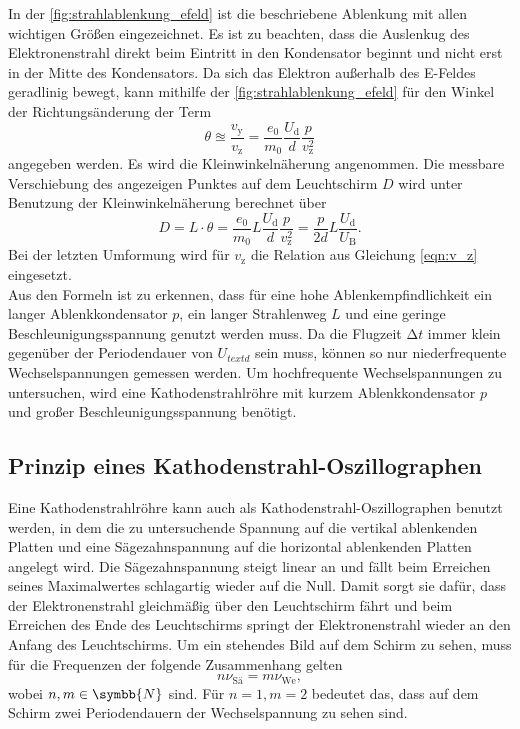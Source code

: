     \noindent In der \autoref{fig:strahlablenkung_efeld} ist die beschriebene Ablenkung mit allen wichtigen Größen eingezeichnet. Es ist zu beachten, dass die Auslenkug
    des Elektronenstrahl direkt beim Eintritt in den Kondensator beginnt und nicht erst in der Mitte des Kondensators. Da sich das Elektron außerhalb des E-Feldes 
    geradlinig bewegt, kann mithilfe der \autoref{fig:strahlablenkung_efeld} für den Winkel der Richtungsänderung der Term 
    \begin{equation*}
        \theta \approxeq \frac{v_{\text{y}}}{v_{\text{z}}} = \frac{e_0}{m_0} \frac{U_{\text{d}}}{d} \frac{p}{v_{\text{z}}^2}
    \end{equation*}
    angegeben werden. Es wird die Kleinwinkelnäherung angenommen. Die messbare Verschiebung des angezeigen Punktes auf dem Leuchtschirm $D$ wird unter Benutzung der Kleinwinkelnäherung
    berechnet über
    \begin{equation*}
        D = L \cdot \theta = \frac{e_0}{m_0} L \frac{U_{\text{d}}}{d} \frac{p}{v_{\text{z}}^2} = \frac{p}{2d} L \frac{U_{\text{d}}}{U_{\text{B}}}. 
    \end{equation*}
    Bei der letzten Umformung wird für $v_{\text{z}}$ die Relation aus Gleichung \eqref{eqn:v_z} eingesetzt. \\

    \noindent Aus den Formeln ist zu erkennen, dass für eine hohe Ablenkempfindlichkeit ein langer Ablenkkondensator $p$, ein langer Strahlenweg $L$ und eine geringe Beschleunigungsspannung 
    genutzt werden muss. Da die Flugzeit $\increment t$ immer klein gegenüber der Periodendauer von $U_{text{d}}$ sein muss, können so nur niederfrequente Wechselspannungen gemessen
    werden. Um hochfrequente Wechselspannungen zu untersuchen, wird eine Kathodenstrahlröhre mit  kurzem Ablenkkondensator $p$ und großer Beschleunigungsspannung benötigt.

\subsection{Prinzip eines Kathodenstrahl-Oszillographen}

    Eine Kathodenstrahlröhre kann auch als Kathodenstrahl-Oszillographen benutzt werden, in dem die zu untersuchende Spannung auf die vertikal ablenkenden Platten und eine Sägezahnspannung 
    auf die horizontal ablenkenden Platten angelegt wird. Die Sägezahnspannung steigt linear an und fällt beim Erreichen seines Maximalwertes schlagartig wieder auf die Null. 
    Damit sorgt sie dafür, dass der Elektronenstrahl gleichmäßig über den Leuchtschirm fährt und beim Erreichen des Ende des Leuchtschirms springt der Elektronenstrahl wieder an
    den Anfang des Leuchtschirms. Um ein stehendes Bild auf dem Schirm zu sehen, muss für die Frequenzen der folgende Zusammenhang gelten
    \begin{equation*}
        n \nu_{\text{Sä}} = m \nu_{\text{We}},
    \end{equation*}
    wobei $n,m \in \symbb{N}$ sind. Für $n=1, m=2$ bedeutet das, dass auf dem Schirm zwei Periodendauern der Wechselspannung zu sehen sind.

